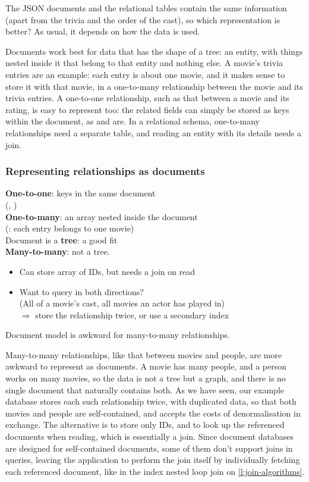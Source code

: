 The JSON documents and the relational tables contain the same information (apart from the trivia and the order of the cast), so which representation is better?
As usual, it depends on how the data is used.

Documents work best for data that has the shape of a tree: an entity, with things nested inside it that belong to that entity and nothing else.
A movie's trivia entries are an example: each entry is about one movie, and it makes sense to store it with that movie, in a one-to-many relationship between the movie and its trivia entries.
A one-to-one relationship, such as that between a movie and its rating, is easy to represent too: the related fields can simply be stored as keys within the document, as  and  are.
In a relational schema, one-to-many relationships need a separate table, and reading an entity with its details needs a join.

\begin{frame}
    \label{s:document-relationships}
    \frametitle{Representing relationships as documents}
    \textbf{One-to-one}: keys in the same document\\
    (, )\\[0.8em]\pause
    \textbf{One-to-many}: an array nested inside the document\\
    (: each entry belongs to one movie)\\[0.8em]
    Document is a \textbf{tree}: a good fit\\[0.8em]\pause
    \textbf{Many-to-many}: not a tree.
    \begin{itemize}
        \item Can store array of IDs, but needs a join on read
        \item Want to query in both directions?\\
            (All of a movie's cast, all movies an actor has played in)\\
            $\Rightarrow$ store the relationship twice, or use a secondary index\\[0.8em]
    \end{itemize}
    Document model is awkward for many-to-many relationships.
\end{frame}
\label{l:document-relationships}

Many-to-many relationships, like that between movies and people, are more awkward to represent as documents.
A movie has many people, and a person works on many movies, so the data is not a tree but a graph, and there is no single document that naturally contains both.
As we have seen, our example database stores each such relationship twice, with duplicated data, so that both movies and people are self-contained, and accepts the costs of denormalisation in exchange.
The alternative is to store only IDs, and to look up the referenced documents when reading, which is essentially a join.
Since document databases are designed for self-contained documents, some of them don't support joins in queries, leaving the application to perform the join itself by individually fetching each referenced document, like in the index nested loop join on \autoref{l:join-algorithms}.

